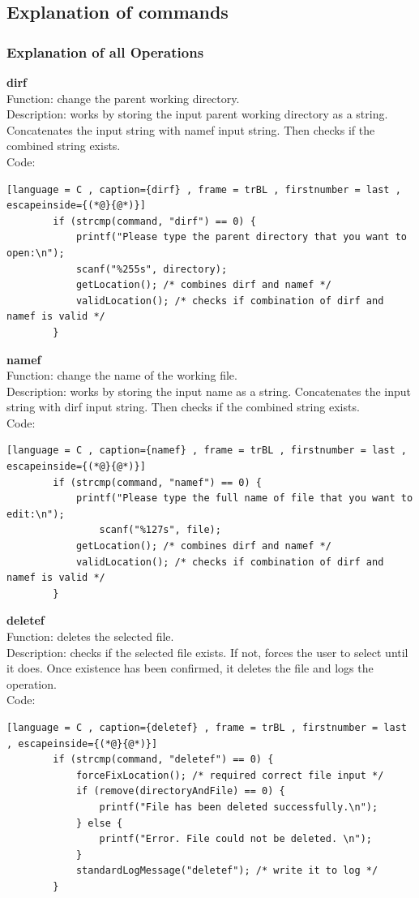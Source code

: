 \documentclass[a4paper]{article}
\theoremstyle{plain}
\theoremstyle{definition}
\theoremstyle{remark}
\begin{document}
\subsection{Explanation of commands}
\subsubsection{Explanation of all Operations}
\- \- \- \- \- \- 
\textbf{dirf} \\
Function: change the parent working directory.\\
Description: works by storing the input parent working directory as a string. Concatenates the input string with namef input string. Then checks if the combined string exists. \\
Code:
\begin{lstlisting}[language = C , caption={dirf} , frame = trBL , firstnumber = last , escapeinside={(*@}{@*)}]
		if (strcmp(command, "dirf") == 0) {
			printf("Please type the parent directory that you want to open:\n");
			scanf("%255s", directory);
			getLocation(); /* combines dirf and namef */
			validLocation(); /* checks if combination of dirf and namef is valid */
		}
\end{lstlisting}

\textbf{namef}\\
Function: change the name of the working file. \\
Description: works by storing the input name as a string. Concatenates the input string with dirf input string. Then checks if the combined string exists.\\
Code:
\begin{lstlisting}[language = C , caption={namef} , frame = trBL , firstnumber = last , escapeinside={(*@}{@*)}]
		if (strcmp(command, "namef") == 0) {
			printf("Please type the full name of file that you want to edit:\n");
		       	scanf("%127s", file);
			getLocation(); /* combines dirf and namef */
			validLocation(); /* checks if combination of dirf and namef is valid */
		}
\end{lstlisting}

\textbf{deletef}\\
Function: deletes the selected file.\\
Description: checks if the selected file exists. If not, forces the user to select until it does. Once existence has been confirmed, it deletes the file and logs the operation.\\ 
Code: 
\begin{lstlisting}[language = C , caption={deletef} , frame = trBL , firstnumber = last , escapeinside={(*@}{@*)}]
		if (strcmp(command, "deletef") == 0) {
			forceFixLocation(); /* required correct file input */
			if (remove(directoryAndFile) == 0) {
				printf("File has been deleted successfully.\n");
			} else {
				printf("Error. File could not be deleted. \n");
			}
			standardLogMessage("deletef"); /* write it to log */
		}
\end{lstlisting}
\end{document}

